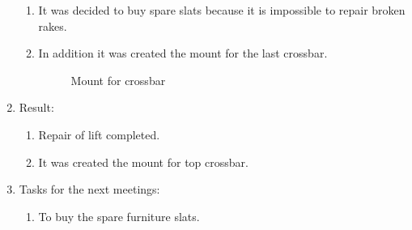 \begin{enumerate}
\begin{enumerate}
      \item It was decided to buy spare slats because it is impossible to repair broken rakes.
      
      \item In addition it was created the mount for the last crossbar.
      
      \begin{figure}[H]
      	\begin{minipage}[h]{1\linewidth}
      		\caption{Mount for crossbar}
      	\end{minipage}
      \end{figure}
      
    \end{enumerate}
    
	\item Result: 
	\begin{enumerate}
	  \item Repair of lift completed.
	  
      \item It was created the mount for top crossbar.
      
    \end{enumerate}
    
	\item Tasks for the next meetings:
	\begin{enumerate}
	  \item To buy the spare furniture slats.
	  
    \end{enumerate}     
\end{enumerate}
\fillpage
